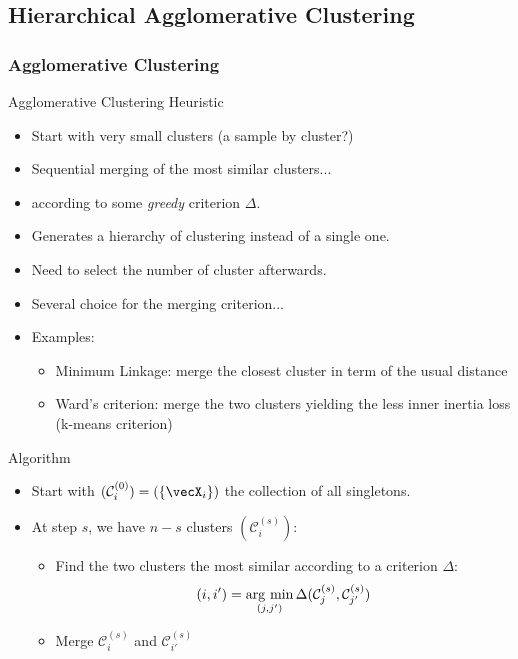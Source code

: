 \documentclass{beamer}\usepackage[]{graphicx}\usepackage[]{color}
\begin{document}
\subsection{Hierarchical Agglomerative Clustering}

\begin{frame}[allowframebreaks]
\frametitle{Agglomerative Clustering}
\begin{block}{Agglomerative Clustering Heuristic}
\begin{itemize}
\item Start with very small clusters (a sample by cluster?)
\item Sequential merging of
the most similar clusters...
\item according to some \emph{greedy} criterion $\Delta$.
\end{itemize}
\end{block}
\begin{itemize}
\item Generates a hierarchy of clustering instead of a single one.
\item Need to select the number of cluster afterwards.
\item Several choice for the merging criterion...
\item Examples:
\begin{itemize}
\item Minimum Linkage: merge the closest cluster in term of the
usual distance
\item Ward's criterion: merge the two clusters yielding the less inner inertia
loss (k-means criterion)
\end{itemize}
\end{itemize}
\framebreak
\begin{block}{Algorithm}
\begin{itemize}
\item Start with $(\mathcal{C}_{i}^{(0)})= (\{ \vecX_i \})$
the collection of all singletons.
\item At step $s$, we have $n-s$ clusters $(\mathcal{C}_{i}^{(s)})$:
\begin{itemize}
\item Find the two clusters the most similar according to a
criterion $\Delta$:%
\begin{align*}
(i,i') = \mathop{\mathrm{arg\ min}}_{(j,j')} \Delta(\mathcal{C}_{j}^{(s)},\mathcal{C}_{j'}^{(s)})
\end{align*}
\item Merge $\mathcal{C}_{i}^{(s)}$ and $\mathcal{C}_{i'}^{(s)}$

\end{itemize}
\end{itemize}
\end{block}
\end{frame}
\end{document}
